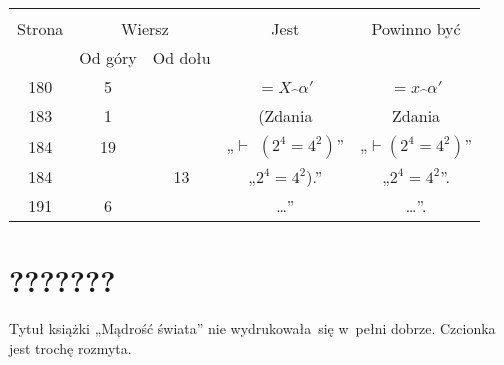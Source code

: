 \documentclass[a4paper,11pt]{article}
\begin{document}
\begin{center}
  \begin{tabular}{|c|c|c|c|c|}
    \hline
    & \multicolumn{2}{c|}{} & & \\
    Strona & \multicolumn{2}{c|}{Wiersz} & Jest
                              & Powinno być \\ \cline{2-3}
    & Od góry & Od dołu & & \\
    \hline
    180 &  5 & & $=\!\! X \hat{ \;\, } \alpha'$
           & $= x \hat{ \;\, } \alpha'$ \\
    183 &  1 & & (Zdania & Zdania \\
    184 & 19 & & „$\vdash$ $( 2^{ 4 } = 4^{ 2 })$”
           & „$\vdash$$( 2^{ 4 } = 4^{ 2 })$” \\
    184 & & 13 & „$2^{ 4 } = 4^{2}$).” & „$2^{ 4 } = 4^{2}$”. \\
    191 &  6 & & \ldots” & \ldots”. \\
    \hline
  \end{tabular}

\end{center}


\vspace{\spaceTwo}










\newpage
\section{???????}

\vspace{\spaceTwo}









\start {} Tytuł książki „Mądrość świata” nie wydrukowała~się
w~pełni dobrze. Czcionka jest trochę rozmyta.
\end{document}
